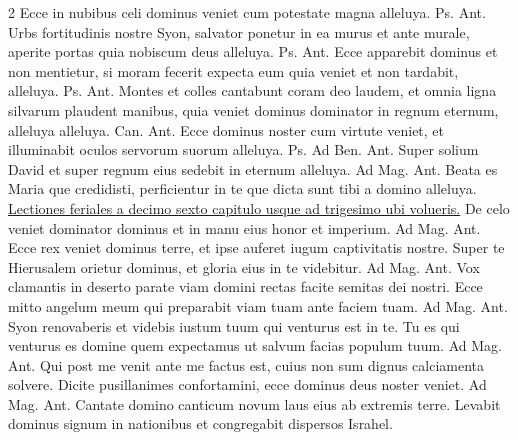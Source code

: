 \begin{multicols*}{2}
 Ecce in nubibus celi dominus veniet cum potestate magna alleluya. {\color{Red} Ps.}  {\color{Red} Ant.} Urbs fortitudinis nostre Syon, salvator ponetur in ea murus et ante murale, aperite portas quia nobiscum deus alleluya. {\color{Red} Ps.}  {\color{Red} Ant.} Ecce apparebit dominus et non mentietur, si moram fecerit expecta eum quia veniet et non tardabit, alleluya. {\color{Red} Ps.}  {\color{Red} Ant.} Montes et colles cantabunt coram deo laudem, et omnia ligna silvarum plaudent manibus, quia veniet dominus dominator in regnum eternum, alleluya alleluya. {\color{Red} Can.}  {\color{Red} Ant.} Ecce dominus noster cum virtute veniet, et illuminabit oculos servorum suorum alleluya. {\color{Red} Ps.}  {\color{Red} Ad Ben. Ant.} Super solium David et super regnum eius sedebit in eternum alleluya. {\color{Red} Ad Mag. Ant.} Beata es Maria que credidisti, perficientur in te que dicta sunt tibi a domino alleluya.
\newline \ul{Lectiones feriales a decimo sexto capitulo usque ad trigesimo ubi volueris.}
 De celo veniet dominator dominus et in manu eius honor et imperium. {\color{Red} Ad Mag. Ant.} Ecce rex veniet dominus terre, et ipse auferet iugum captivitatis nostre.
 Super te Hierusalem orietur dominus, et gloria eius in te videbitur. {\color{Red} Ad Mag. Ant.} Vox clamantis in deserto parate viam domini rectas facite semitas dei nostri.
 Ecce mitto angelum meum qui preparabit viam tuam ante faciem tuam. {\color{Red} Ad Mag. Ant.} Syon renovaberis et videbis iustum tuum qui venturus est in te.
 Tu es qui venturus es domine quem expectamus ut salvum facias populum tuum. {\color{Red} Ad Mag. Ant.} Qui post me venit ante me factus est, cuius non sum dignus calciamenta solvere.
 Dicite pusillanimes confortamini, ecce dominus deus noster veniet. {\color{Red} Ad Mag. Ant.} Cantate domino canticum novum laus eius ab extremis terre.
 Levabit dominus signum in nationibus et congregabit dispersos Israhel.

\end{multicols*}
